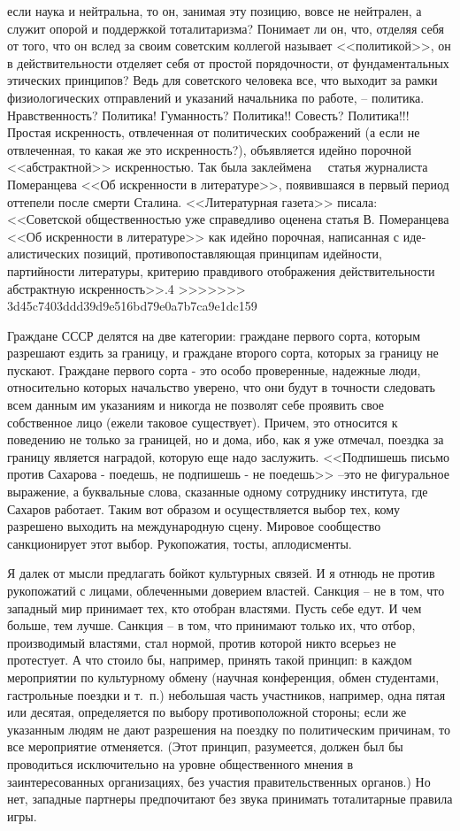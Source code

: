 \documentclass{book}
\begin{document}
{если наука и нейтральна, то он, занимая эту позицию, вовсе не нейтрален, а служит опо­рой и поддержкой тоталитаризма? Понимает ли он, что, отделяя себя от того, что он вслед за своим советским коллегой назы­вает <<политикой>>, он в действительности отделяет себя от простой порядочности, от фундаментальных этических прин­ципов? Ведь для советского человека все, что выходит за рамки физиологических отправлений и указаний начальника по рабо­те, -- политика. Нравственность? Политика! Гуманность? По­литика!! Совесть? Политика!!! Простая искренность, отвлечен­ная от политических соображений (а если не отвлеченная, то какая же это искренность?), объявляется идейно порочной <<абстрактной>> искренностью. Так была заклеймена   статья журналиста Померанцева <<Об искренности в литературе>>, по­явившаяся в первый период оттепели после смерти Сталина. <<Литературная газета>> писала: <<Советской общественностью уже справедливо оценена статья В. Померанцева <<Об искрен­ности в литературе>> как идейно порочная, написанная с 
иде­алистических позиций, противопоставляющая принципам идей­ности, партийности литературы, критерию правдивого отобра­жения действительности абстрактную искренность>>.4
>>>>>>> 3d45c7403ddd39d9e516bd79e0a7b7ca9e1dc159

Граждане СССР делятся на две категории: граждане перво­го сорта, которым разрешают ездить за границу, и граждане второго сорта, которых за границу не пускают. Граждане пер­вого сорта - это особо проверенные, надежные люди, относи­тельно которых начальство уверено, что они будут в точности следовать всем данным им указаниям и никогда не позволят себе проявить свое собственное лицо (ежели таковое существует). Причем, это относится к поведению не только за границей, но и дома, ибо, как я уже отмечал, поездка за границу является наградой, которую еще надо заслужить. <<Подпишешь письмо против Сахарова - поедешь, не подпишешь - не пое­дешь>> --это не фигуральное выражение, а буквальные слова, сказанные одному сотруднику института, где Сахаров рабо­тает. Таким вот образом и осуществляется выбор тех, кому разрешено выходить на международную сцену. Мировое сооб­щество санкционирует этот выбор. Рукопожатия, тосты, апло­дисменты.

Я далек от мысли предлагать бойкот культурных связей. И я отнюдь не против рукопожатий с лицами, облеченными доверием властей. Санкция -- не в том, что западный мир прини­мает тех, кто отобран властями. Пусть себе едут. И чем боль­ше, тем лучше. Санкция -- в том, что принимают только их, что отбор, производимый властями, стал нормой, против кото­рой никто всерьез не протестует. А что стоило бы, например, принять такой принцип: в каждом мероприятии по культур­ному обмену (научная конференция, обмен студентами, га­строльные поездки и т.~п.) небольшая часть участников, напри­мер, одна пятая или десятая, определяется по выбору проти­воположной стороны; если же указанным людям не дают раз­решения на поездку по политическим причинам, то все меро­приятие отменяется. (Этот принцип, разумеется, должен был бы проводиться исключительно на уровне общественного мне­ния в заинтересованных организациях, без участия правитель­ственных органов.) Но нет, западные партнеры предпочитают без звука принимать тоталитарные правила 
игры.

}
\end{document}
